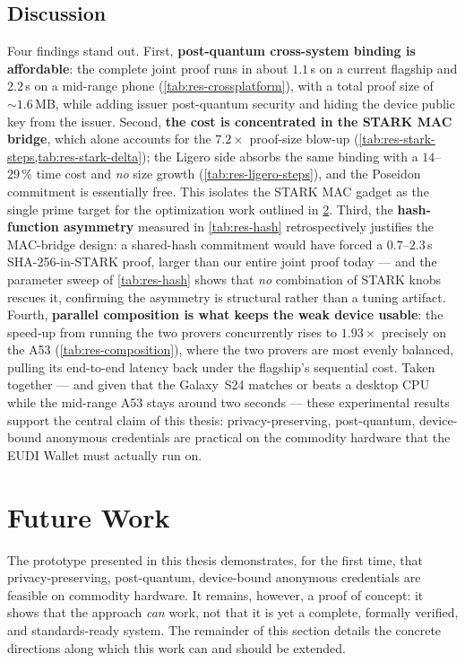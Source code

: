 \documentclass[binding=0.6cm,oneside,noexaminfo]{sapthesis}
\begin{document}
\section{Discussion}
\label{results:discussion}
Four findings stand out. First, \textbf{post-quantum cross-system binding is
affordable}: the complete joint proof runs in about $1.1$\,s on a current
flagship and $2.2$\,s on a mid-range phone (\cref{tab:res-crossplatform}), with a
total proof size of ${\sim}1.6$\,MB, while adding issuer post-quantum security and
hiding the device public key from the issuer. Second, \textbf{the cost is
concentrated in the STARK MAC bridge}, which alone accounts for the $7.2\times$
proof-size blow-up (\cref{tab:res-stark-steps,tab:res-stark-delta}); the Ligero
side absorbs the same binding with a $14$--$29\,\%$ time cost and \emph{no} size
growth (\cref{tab:res-ligero-steps}), and the Poseidon commitment is essentially
free. This isolates the STARK MAC gadget as the single prime target for the
optimization work outlined in \cref{sec:future-work}. Third, the
\textbf{hash-function asymmetry} measured in \cref{tab:res-hash} retrospectively
justifies the MAC-bridge design: a shared-hash commitment would have forced a
$0.7$--$2.3$\,s SHA-256-in-STARK proof, larger than our entire joint proof today
--- and the parameter sweep of \cref{tab:res-hash} shows that \emph{no}
combination of STARK knobs rescues it, confirming the asymmetry is structural
rather than a tuning artifact. Fourth, \textbf{parallel composition is what keeps
the weak device usable}: the speed-up from running the two provers concurrently
rises to $1.93\times$ precisely on the A53 (\cref{tab:res-composition}), where the
two provers are most evenly balanced, pulling its end-to-end latency back under
the flagship's sequential cost. Taken together --- and given that the Galaxy~S24
matches or beats a desktop CPU while the mid-range A53 stays around two seconds
--- these experimental results support the central claim of this thesis: privacy-preserving,
post-quantum, device-bound anonymous credentials are practical on the commodity
hardware that the EUDI Wallet must actually run on.

\chapter{Future Work}
\label{sec:future-work}

The prototype presented in this thesis demonstrates, for the first time, that privacy-preserving, post-quantum, device-bound anonymous credentials are feasible on commodity hardware. It remains, however, a proof of concept: it shows that the approach \emph{can} work, not that it is yet a complete, formally verified, and standards-ready system. The remainder of this section details the concrete directions along which this work can and should be extended.
\end{document}
